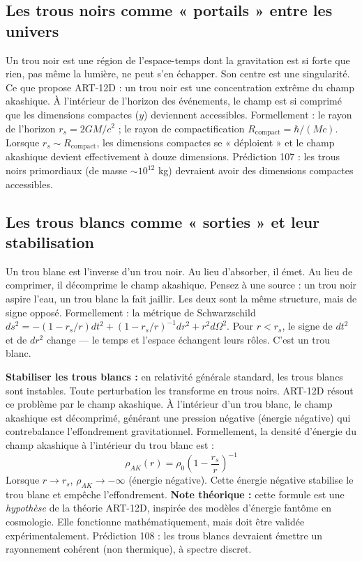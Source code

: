 \documentclass[11pt,a4paper]{article}
\begin{document}
\subsection{Les trous noirs comme « portails » entre les univers}
Un trou noir est une région de l'espace-temps dont la gravitation est si forte que rien, pas même la lumière, ne peut s'en échapper. Son centre est une singularité. Ce que propose ART-12D : un trou noir est une concentration extrême du champ akashique. À l'intérieur de l'horizon des événements, le champ est si comprimé que les dimensions compactes ($y$) deviennent accessibles. Formellement : le rayon de l'horizon $r_s = 2GM/c^2$ ; le rayon de compactification $R_{\text{compact}} = \hbar/(Mc)$. Lorsque $r_s \sim R_{\text{compact}}$, les dimensions compactes se « déploient » et le champ akashique devient effectivement à douze dimensions. Prédiction 107 : les trous noirs primordiaux (de masse $\sim 10^{12}$ kg) devraient avoir des dimensions compactes accessibles.

\subsection{Les trous blancs comme « sorties » et leur stabilisation}
Un trou blanc est l'inverse d'un trou noir. Au lieu d'absorber, il émet. Au lieu de comprimer, il décomprime le champ akashique. Pensez à une source : un trou noir aspire l'eau, un trou blanc la fait jaillir. Les deux sont la même structure, mais de signe opposé. Formellement : la métrique de Schwarzschild $ds^2 = -(1-r_s/r)dt^2 + (1-r_s/r)^{-1}dr^2 + r^2 d\Omega^2$. Pour $r < r_s$, le signe de $dt^2$ et de $dr^2$ change --- le temps et l'espace échangent leurs rôles. C'est un trou blanc.

\textbf{Stabiliser les trous blancs :} en relativité générale standard, les trous blancs sont instables. Toute perturbation les transforme en trous noirs. ART-12D résout ce problème par le champ akashique. À l'intérieur d'un trou blanc, le champ akashique est décomprimé, générant une pression négative (énergie négative) qui contrebalance l'effondrement gravitationnel. Formellement, la densité d'énergie du champ akashique à l'intérieur du trou blanc est :
\begin{equation}
\rho_{AK}(r) = \rho_0 \left(1 - \frac{r_s}{r}\right)^{-1}
\end{equation}
Lorsque $r \to r_s$, $\rho_{AK} \to -\infty$ (énergie négative). Cette énergie négative stabilise le trou blanc et empêche l'effondrement. \textbf{Note théorique :} cette formule est une \textit{hypothèse} de la théorie ART-12D, inspirée des modèles d'énergie fantôme en cosmologie. Elle fonctionne mathématiquement, mais doit être validée expérimentalement. Prédiction 108 : les trous blancs devraient émettre un rayonnement cohérent (non thermique), à spectre discret.
\end{document}
